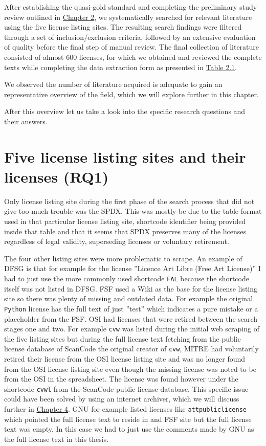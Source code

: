 After establishing the quasi-gold standard and completing the preliminary study review outlined in \hyperref[methods]{Chapter 2}, we systematically searched for relevant literature using the five license listing sites. The resulting search findings were filtered through a set of inclusion/exclusion criteria, followed by an extensive evaluation of quality before the final step of manual review. The final collection of literature consisted of almost 600 licenses, for which we obtained and reviewed the complete texts while completing the data extraction form as presented in \hyperref[table:extraction]{Table 2.1}.

We observed the number of literature acquired is adequate to gain an representative overview of the field, which we will explore further in this chapter.

After this overview let us take a look into the specific research questions and their answers.

\section{Five license listing sites and their licenses (RQ1)}
Only license listing site during the first phase of the search process that did not give too much trouble was the SPDX. This was mostly be due to the table format used in that particular license listing site, shortcode identifier being provided inside that table and that it seems that SPDX preserves many of the licenses regardless of legal validity, superseding licenses or voluntary retirement.

The four other listing sites were more problematic to scrape. An example of DFSG is that for example for the license ''Licence Art Libre (Free Art License)'' I had to just use the more commonly used shortcode \texttt{FAL} because the shortcode itself was not listed in DFSG. FSF used a Wiki as the base for the license listing site so there was plenty of missing and outdated data. For example the original \texttt{Python} license has the full text of just ''test'' which indicates a pure mistake or a placeholder from the FSF. OSI had licenses that were retired between the search stages one and two. For example \texttt{cvw} was listed during the initial web scraping of the five listing sites but during the full license text fetching from the public license database of ScanCode the original creator of \texttt{cvw}, MITRE had voluntarily retired their license from the OSI license listing site and was no longer found from the OSI license listing site even though the missing license was noted to be from the OSI in the spreadsheet. The license was found however under the shortcode \texttt{cvwl} from the ScanCode public license database. This specific issue could have been solved by using an internet archiver, which we will discuss further in \hyperref[discussion]{Chapter 4}. GNU for example listed licenses like \texttt{attpubliclicense} which pointed the full license text to reside in and FSF site but the full license text was empty. In this case we had to just use the comments made by GNU as the full license text in this thesis.

